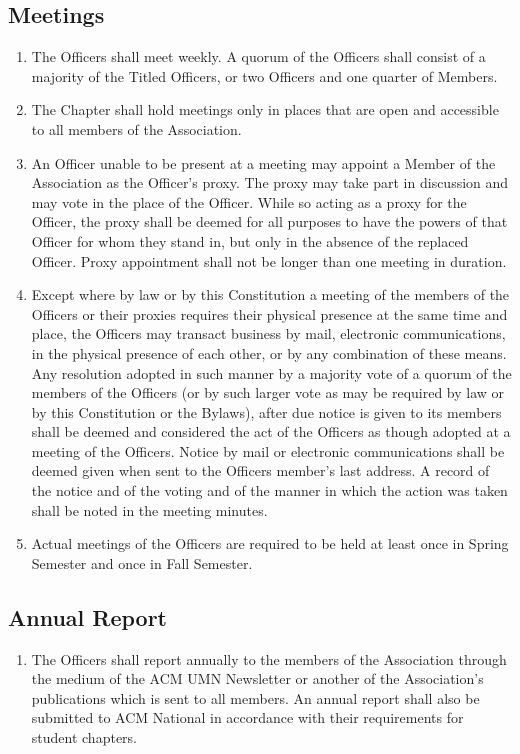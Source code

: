 \subsection{Meetings}
\begin{enumerate}
	\item The Officers shall meet weekly. A quorum of the Officers shall consist of a majority of the Titled Officers, or two Officers and one quarter of Members.
	\item The Chapter shall hold meetings only in places that are open and accessible to all members of the Association.
	\item An Officer unable to be present at a meeting may appoint a Member of the Association as the Officer’s proxy. The proxy may take part in discussion and may vote in the place of the Officer. While so acting as a proxy for the Officer, the proxy shall be deemed for all purposes to have the powers of that Officer for whom they stand in, but only in the absence of the replaced Officer. Proxy appointment shall not be longer than one meeting in duration.
	\item Except where by law or by this Constitution a meeting of the members of the Officers or their proxies requires their physical presence at the same time and place, the Officers may transact business by mail, electronic communications, in the physical presence of each other, or by any combination of these means. Any resolution adopted in such manner by a majority vote of a quorum of the members of the Officers (or by such larger vote as may be required by law or by this Constitution or the Bylaws), after due notice is given to its members shall be deemed and considered the act of the Officers as though adopted at a meeting of the Officers. Notice by mail or electronic communications shall be deemed given when sent to the Officers member's last address. A record of the notice and of the voting and of the manner in which the action was taken shall be noted in the meeting minutes.
	\item Actual meetings of the Officers are required to be held at least once in Spring Semester and once in Fall Semester.
\end{enumerate}

\subsection{Annual Report}
\begin{enumerate}
	\item The Officers shall report annually to the members of the Association through the medium of the ACM UMN Newsletter or another of the Association's publications which is sent to all members. An annual report shall also be submitted to ACM National in accordance with their requirements for student chapters.
\end{enumerate}

